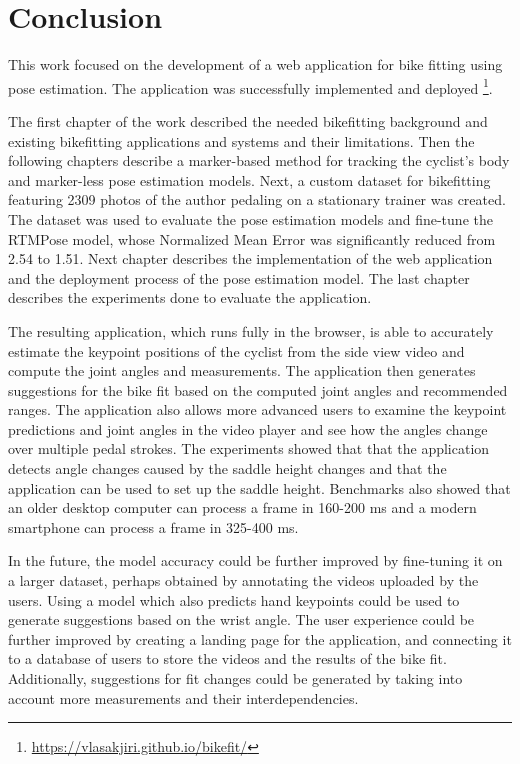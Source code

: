 
\chapter{Conclusion}
\label{conclusion}

This work focused on the development of a web application for bike fitting using pose estimation. The application was successfully implemented and deployed \footnote{\url{https://vlasakjiri.github.io/bikefit/}}.

The first chapter of the work described the needed bikefitting background and existing bikefitting applications and systems and their limitations. Then the following chapters describe a marker-based method for tracking the cyclist's body and marker-less pose estimation models. Next, a custom dataset for bikefitting featuring 2309 photos of the author pedaling on a stationary trainer was created. The dataset was used to evaluate the pose estimation models and fine-tune the RTMPose model, whose Normalized Mean Error was significantly reduced from 2.54 to 1.51. Next chapter describes the implementation of the web application and the deployment process of the pose estimation model. The last chapter describes the experiments done to evaluate the application.

The resulting application, which runs fully in the browser, is able to accurately estimate the keypoint positions of the cyclist from the side view video and compute the joint angles and measurements. The application then generates suggestions for the bike fit based on the computed joint angles and recommended ranges. The application also allows more advanced users to examine the keypoint predictions and joint angles in the video player and see how the angles change over multiple pedal strokes. The experiments showed that that the application detects angle changes caused by the saddle height changes and that the application can be used to set up the saddle height. Benchmarks also showed that an older desktop computer can process a frame in 160-200 ms and a modern smartphone can process a frame in 325-400 ms.

In the future, the model accuracy could be further improved by fine-tuning it on a larger dataset, perhaps obtained by annotating the videos uploaded by the users. Using a model which also predicts hand keypoints could be used to generate suggestions based on the wrist angle. The user experience could be further improved by creating a landing page for the application, and connecting it to a database of users to store the videos and the results of the bike fit. Additionally, suggestions for fit changes could be generated by taking into account more measurements and their interdependencies.



% 